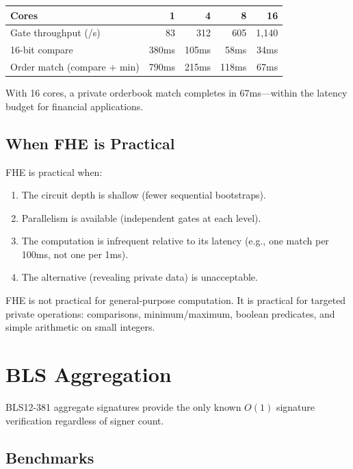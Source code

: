 \documentclass[11pt,a4paper]{article}
\begin{document}
\begin{center}
\begin{tabular}{lrrrr}
\toprule
\textbf{Cores} & \textbf{1} & \textbf{4} & \textbf{8} & \textbf{16} \\
\midrule
Gate throughput (/s) & 83 & 312 & 605 & 1,140 \\
16-bit compare & 380ms & 105ms & 58ms & 34ms \\
Order match (compare + min) & 790ms & 215ms & 118ms & 67ms \\
\bottomrule
\end{tabular}
\end{center}

With 16 cores, a private orderbook match completes in 67ms---within the latency budget for financial applications.

\subsection{When FHE is Practical}

FHE is practical when:
\begin{enumerate}[leftmargin=2em]
\item The circuit depth is shallow (fewer sequential bootstraps).
\item Parallelism is available (independent gates at each level).
\item The computation is infrequent relative to its latency (e.g., one match per 100ms, not one per 1ms).
\item The alternative (revealing private data) is unacceptable.
\end{enumerate}

FHE is not practical for general-purpose computation. It is practical for targeted private operations: comparisons, minimum/maximum, boolean predicates, and simple arithmetic on small integers.

\section{BLS Aggregation}

BLS12-381 aggregate signatures provide the only known $O(1)$ signature verification regardless of signer count.

\subsection{Benchmarks}
\end{document}
